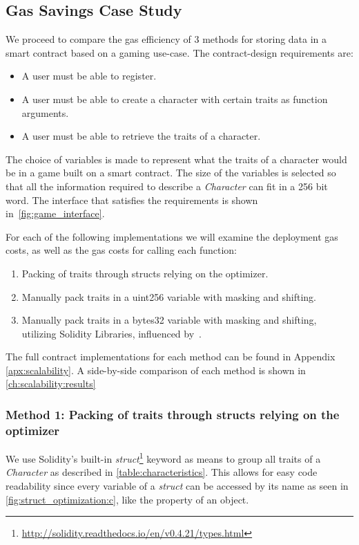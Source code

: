 \subsection{Gas Savings Case Study}

We proceed to compare the gas efficiency of 3 methods for storing data in a smart contract based on a gaming use-case. The contract-design requirements are: 
\begin{itemize}
    \item A user must be able to register.
    \item A user must be able to create a character with certain traits as function arguments.
    \item A user must be able to retrieve the traits of a character.
\end{itemize}




The choice of variables is made to represent what the traits of a character would be in a game built on a smart contract. The size of the variables is selected so that all the information required to describe a \textit{Character} can fit in a 256 bit word. The interface that satisfies the requirements is shown in~\ref{fig:game_interface}.

For each of the following implementations we will examine the deployment gas costs, as well as the gas costs for calling each function:

\begin{enumerate}
    \item Packing of traits through structs relying on the optimizer.
    \item Manually pack traits in a uint256 variable with masking and shifting.
    \item Manually pack traits in a bytes32 variable with masking and shifting, utilizing Solidity Libraries, influenced by~\cite{virtualstruct}.
\end{enumerate}

The full contract implementations for each method can be found in Appendix \ref{apx:scalability}. A side-by-side comparison of each method is shown in \ref{ch:scalability:results}%

\subsubsection{Method 1: Packing of traits through structs relying on the optimizer} \label{method1}
We use Solidity's built-in \textit{struct}\footnote{\url{http://solidity.readthedocs.io/en/v0.4.21/types.html}} keyword as means to group all traits of a \textit{Character} as described in \ref{table:characteristics}. This allows for easy code readability since every variable of a \textit{struct} can be accessed by its name as seen in \ref{fig:struct_optimization:c}, like the property of an object. 

